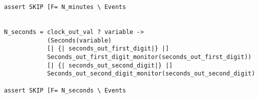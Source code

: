 \begin{verbatim}
assert SKIP [F= N_minutes \ Events


N_seconds = clock_out_val ? variable ->
            (Seconds(variable)
            [| {| seconds_out_first_digit|} |]
            Seconds_out_first_digit_monitor(seconds_out_first_digit))
            [| {| seconds_out_second_digit|} |]
            Seconds_out_second_digit_monitor(seconds_out_second_digit)

assert SKIP [F= N_seconds \ Events

\end{verbatim}

